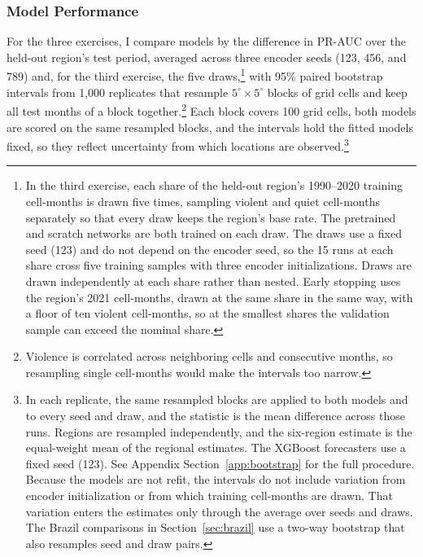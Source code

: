 \documentclass[11pt, letterpaper]{article}
\begin{document}
\subsubsection{Model Performance}
For the three exercises, I compare models by the difference in PR-AUC over the held-out region's test period, averaged across three encoder seeds (123, 456, and 789) and, for the third exercise, the five draws,\footnote{In the third exercise, each share of the held-out region's 1990--2020 training cell-months is drawn five times, sampling violent and quiet cell-months separately so that every draw keeps the region's base rate. The pretrained and scratch networks are both trained on each draw. The draws use a fixed seed (123) and do not depend on the encoder seed, so the 15 runs at each share cross five training samples with three encoder initializations. Draws are drawn independently at each share rather than nested. Early stopping uses the region's 2021 cell-months, drawn at the same share in the same way, with a floor of ten violent cell-months, so at the smallest shares the validation sample can exceed the nominal share.} with 95\% paired bootstrap intervals from 1,000 replicates that resample $5^\circ \times 5^\circ$ blocks of grid cells and keep all test months of a block together.\footnote{Violence is correlated across neighboring cells and consecutive months, so resampling single cell-months would make the intervals too narrow.} Each block covers 100 grid cells, both models are scored on the same resampled blocks, and the intervals hold the fitted models fixed, so they reflect uncertainty from which locations are observed.\footnote{In each replicate, the same resampled blocks are applied to both models and to every seed and draw, and the statistic is the mean difference across those runs. Regions are resampled independently, and the six-region estimate is the equal-weight mean of the regional estimates. The XGBoost forecasters use a fixed seed (123). See Appendix Section~\ref{app:bootstrap} for the full procedure. Because the models are not refit, the intervals do not include variation from encoder initialization or from which training cell-months are drawn. That variation enters the estimates only through the average over seeds and draws. The Brazil comparisons in Section~\ref{sec:brazil} use a two-way bootstrap that also resamples seed and draw pairs.}
\end{document}
